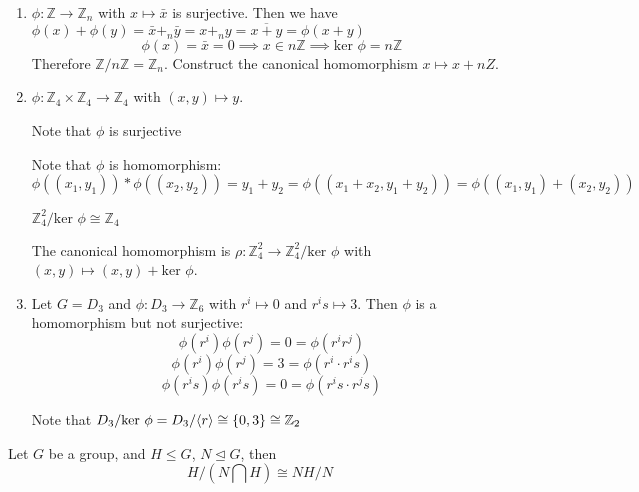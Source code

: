 \begin{example}
\begin{enumerate}
\item
$\phi:\mathbb{Z}\to\mathbb{Z}_n$ with $x\mapsto\bar{x}$ is surjective. Then we have $\phi(x)+\phi(y)=\bar{x}+_n\bar{y}=x+_ny=\overline{x+y}=\phi(x+y)$
\[
\phi(x)=\bar{x}=0\implies x\in n\mathbb{Z}\implies\mbox{ker }\phi=n\mathbb{Z}
\]
Therefore $\mathbb{Z}/n\mathbb{Z}=\mathbb{Z}_n$. Construct the canonical homomorphism $x\mapsto x+nZ$.
\item
$\phi:\mathbb{Z}_4\times\mathbb{Z}_4\to\mathbb{Z}_4$ with $(x,y)\mapsto y$.

Note that $\phi$ is surjective

Note that $\phi$ is homomorphism:
\[
\phi((x_1,y_1))*\phi((x_2,y_2))=y_1+y_2=\phi((x_1+x_2,y_1+y_2))
=
\phi((x_1,y_1)+(x_2,y_2))
\]

$\mathbb{Z}_4^2/\mbox{ker }\phi\cong\mathbb{Z}_4$

The canonical homomorphism is $\rho:\mathbb{Z}_4^2\to\mathbb{Z}_4^2/\mbox{ker }\phi$ with $(x,y)\mapsto (x,y)+\mbox{ker }\phi$.


\item
Let $G=D_3$ and $\phi:D_3\to\mathbb{Z}_6$ with $r^i\mapsto0$ and $r^is\mapsto 3$. Then $\phi$ is a homomorphism but not surjective:
\[
\phi(r^i)\phi(r^j)=0=\phi(r^ir^j)
\]
\[
\phi(r^i)\phi(r^j)=3=\phi(r^i\cdot r^is)
\]
\[
\phi(r^is)\phi(r^is)=0=\phi(r^is\cdot r^js)
\]

Note that $D_3/\mbox{ker }\phi=D_3/\langle r\rangle\cong\{0,3\}\cong\mathbb{Z}_2$
\end{enumerate}
\end{example}
\begin{theorem}
Let $G$ be a group, and $H\le G$, $N\trianglelefteq G$, then
\[
H/(N\bigcap H)\cong NH/N
\]
\end{theorem}




















